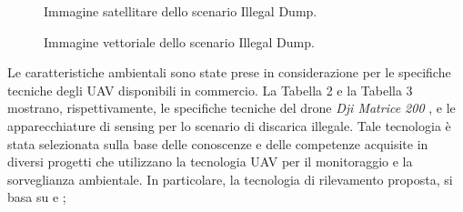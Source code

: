 \begin{figure}[H] 
    \captionsetup{justification=centering, margin=2cm, font=footnotesize}
    \begin{center}
    \end{center}
    \caption{Immagine satellitare dello scenario Illegal Dump.}
    \label{dump_map}
\end{figure}

\begin{figure}[H] 
    \captionsetup{justification=centering, margin=2cm, font=footnotesize}
    \begin{center}
    \end{center}
    \caption{Immagine vettoriale dello scenario Illegal Dump.}
    \label{dump_scenario}
\end{figure}

Le caratteristiche ambientali sono state prese in considerazione per le specifiche tecniche degli UAV disponibili in commercio. 
La Tabella 2 e la Tabella 3 mostrano, rispettivamente, le specifiche tecniche del drone \textit{Dji Matrice 200} \cite{matrice200}, e le apparecchiature di sensing per lo scenario di discarica illegale.
Tale tecnologia è stata selezionata sulla base delle conoscenze e delle competenze acquisite in diversi progetti che utilizzano la tecnologia UAV per il monitoraggio e la sorveglianza ambientale. 
In particolare, la tecnologia di rilevamento proposta, si basa su \cite{persechino2010aerospace} e \cite{lega2012using};

